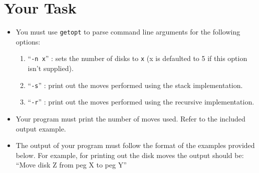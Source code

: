 \documentclass[11pt]{article}
\begin{document}
\section{Your Task}
\begin{itemize}
  \item You must use \texttt{getopt} to parse command line arguments for the
      following options:
      \begin{enumerate}
          \item ``\texttt{-n x}'' : sets the number of disks to \texttt{x} (x is
              defaulted to 5 if this option isn't supplied).
        \item ``\texttt{-s}'' : print out the moves performed using the stack
            implementation.
        \item ``\texttt{-r}'' : print out the moves performed using the
            recursive implementation.
      \end{enumerate}

  \item Your program must print the number of moves used. Refer to the included output example.


  \item The output of your program must follow the format of the examples provided below. For example, for printing out the disk moves the output should be: ``Move disk Z from peg X to peg Y''
\end{itemize}
\end{document}
